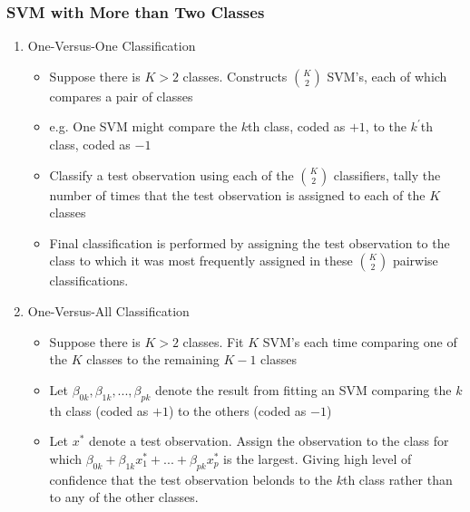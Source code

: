 \documentclass[11pt]{article}
\begin{document}
\subsubsection{SVM with More than Two Classes}
\begin{enumerate}
    \item One-Versus-One Classification
        \begin{itemize}
            \item Suppose there is $K > 2$ classes. Constructs $\binom{K}{2}$ SVM's, each of which compares a pair of classes
            \item e.g. One SVM might compare the $k$th class, coded as $+1$, to the $k^{'}$th class, coded as $-1$
            \item Classify a test observation using each of the $\binom{K}{2}$ classifiers, tally the number of times that the test observation is assigned to each of the $K$ classes
            \item Final classification is performed by assigning the test observation to the class to which it was most frequently assigned in these $\binom{K}{2}$ pairwise classifications.
        \end{itemize}
    \item One-Versus-All Classification
        \begin{itemize}
            \item Suppose there is $K > 2$ classes. Fit $K$ SVM's each time comparing one of the $K$ classes to the remaining $K-1$ classes
            \item Let $\beta_{0k}, \beta_{1k}, ..., \beta_{pk}$ denote the result from fitting an SVM comparing the $k$th class (coded as $+1$) to the others (coded as $-1$)
            \item Let $x^*$ denote a test observation. Assign the observation to the class for which $\beta_{0k} + \beta_{1k}x_{1}^* + ... + \beta_{pk}x_{p}^*$ is the largest. Giving high level of confidence that the test observation belonds to the $k$th class rather than to any of the other classes.
        \end{itemize}
\end{enumerate}
\end{document}
